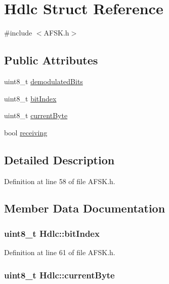 \hypertarget{struct_hdlc}{}\section{Hdlc Struct Reference}
\label{struct_hdlc}


{\ttfamily \#include $<$A\+F\+S\+K.\+h$>$}

\subsection*{Public Attributes}
\begin{DoxyCompactItemize}
\item 
uint8\+\_\+t \hyperlink{struct_hdlc_a1be563f695b6ea1097624b75e81b89b8}{demodulated\+Bits}
\item 
uint8\+\_\+t \hyperlink{struct_hdlc_ac2a3d40847828c994ae837f34d22bba7}{bit\+Index}
\item 
uint8\+\_\+t \hyperlink{struct_hdlc_a3cff2def6c18174cabe180aab91ac32f}{current\+Byte}
\item 
bool \hyperlink{struct_hdlc_ad7bc494d6beca6c71123a96cee2baeb7}{receiving}
\end{DoxyCompactItemize}


\subsection{Detailed Description}


Definition at line 58 of file A\+F\+S\+K.\+h.



\subsection{Member Data Documentation}
\subsubsection[{\texorpdfstring{bit\+Index}{bitIndex}}]{\setlength{\rightskip}{0pt plus 5cm}uint8\+\_\+t Hdlc\+::bit\+Index}\hypertarget{struct_hdlc_ac2a3d40847828c994ae837f34d22bba7}{}\label{struct_hdlc_ac2a3d40847828c994ae837f34d22bba7}


Definition at line 61 of file A\+F\+S\+K.\+h.

\subsubsection[{\texorpdfstring{current\+Byte}{currentByte}}]{\setlength{\rightskip}{0pt plus 5cm}uint8\+\_\+t Hdlc\+::current\+Byte}\hypertarget{struct_hdlc_a3cff2def6c18174cabe180aab91ac32f}{}\label{struct_hdlc_a3cff2def6c18174cabe180aab91ac32f}



